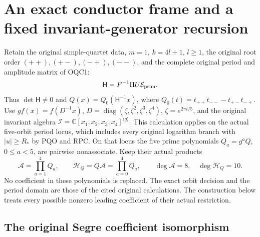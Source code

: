 \documentclass[11pt,a4paper]{article}
\begin{document}

\clearpage
\section{An exact conductor frame and a fixed invariant-generator recursion}
\label{sec:OCF}

Retain the original simple-quartet data, $m=1$, $k=4l+1$,
$l\geq1$, the original root order $(++),(+-),(-+),(--)$, and
the complete original period and amplitude matrix of OQC1:
\[
                  \mathsf H=F^{-1}\Pi U\mathcal E_{\rm prim}.
\]
Thus $\det\mathsf H\ne0$ and
$Q(x)=Q_0(\mathsf H^{-1}x)$, where
$Q_0(t)=t_{++}t_{--}-t_{+-}t_{-+}$.
Use $g f(x)=f(D^{-1}x)$,
$D=\operatorname{diag}(\zeta,\zeta^2,\zeta^3,\zeta^4)$,
$\zeta=e^{2\pi i/5}$, and the original invariant algebra
$\mathscr I=\mathbb C[x_1,x_2,x_3,x_4]^{\langle g\rangle}$.
This calculation applies on the actual five-orbit period locus,
which includes every original logarithm branch with $|u|\geq R_*$
by PQO and RPC. On that locus the five prime polynomials
$Q_a=g^aQ$, $0\leq a<5$, are pairwise nonassociate. Keep their
actual products
\[
 \mathcal A=\prod_{a=1}^4Q_a,\qquad
 \mathcal H_Q=Q\mathcal A=\prod_{a=0}^4Q_a,
 \qquad \deg\mathcal A=8,\quad\deg\mathcal H_Q=10.
 \tag{OCF1}
\]
No coefficient in these polynomials is replaced. The exact orbit
decision and the period domain are those of the cited original
calculations. The construction below treats every possible nonzero
leading coefficient of their actual restriction.

\subsection{The original Segre coefficient isomorphism}
\end{document}
